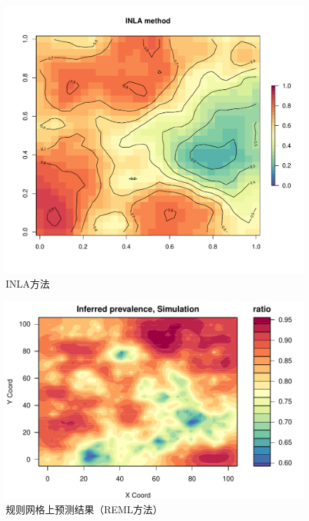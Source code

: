 \documentclass[hyperref, a4paper, UTF8, zihao = -4, linespread = 1.25, scheme = chinese]{ctexbook}
\begin{document}
\begin{figure}

{\centering \includegraphics[width=0.7\linewidth]{figures/INLA-simulation} 

}

\caption{INLA方法}\label{fig:inla-simulation}
\end{figure}

\newpage

\begin{figure}

{\centering \includegraphics[width=0.7\linewidth]{figures/spaMM-simulation} 

}

\caption{规则网格上预测结果（REML方法）}\label{fig:spamm-sim}
\end{figure}
\end{document}
